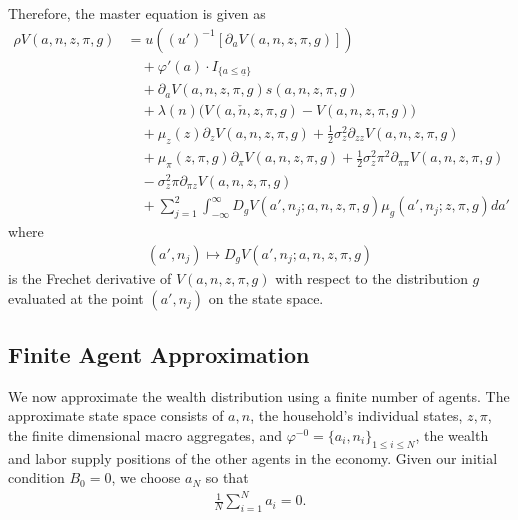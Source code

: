 \documentclass[notitlepage,a4paper,11pt]{report}
\numberwithin{section}{chapter}
\numberwithin{subsection}{section}
\begin{document}
Therefore, the master equation is given as 
\begin{align*}
\rho V(a,n,z,\pi,g) & = u \left(  (u')^{-1} \left[ \partial_a V(a,n,z, \pi,g) \right]  \right) \tag{Flow Utility + FOC} \\[10pt]
& \quad + \varphi'(a) \cdot I_{\{ a \leq \underline{a} \} } \tag{Borrowing Penalty}\\[10pt]
& \quad + \partial_a V(a,n,z,\pi,g) s(a,n,z,\pi,g)  \tag{Individual Wealth} \\[10pt]
& \quad + \lambda(n) \Big( V(a,\check{n},z,\pi,g)- V(a,n,z,\pi,g) \Big)\tag{Individual Labor Supply} \\[10pt]
& \quad + \mu_z(z) \partial_z V(a,n,z,\pi,g) + \frac{1}{2} \sigma_z^2 \partial_{zz} V(a,n,z,\pi,g) \tag{TFP} \\[10pt]
& \quad + \mu_{\pi}(z,\pi,g) \partial_{\pi} V(a,n,z,\pi,g)+ \frac{1}{2} \sigma_z^2 \pi^2 \partial_{\pi \pi} V(a,n,z,\pi,g) \tag{Inflation} \\[10pt]
& \quad - \sigma_z^2 \pi \partial_{\pi z} V(a,n,z,\pi,g) \tag{Cross Variation Term} \\[10pt]
& \quad + \sum_{j=1}^2 \int_{-\infty}^{\infty} D_g V(a',n_j ; a,n,z,\pi,g) \mu_g( a', n_j ; z,\pi, g) da'  \tag{Wealth Distribution} 
\end{align*}
where 
\begin{align*}
(a',n_j) \mapsto D_g V(a',n_j ; a,n,z,\pi,g)    
\end{align*}
is the Frechet derivative of $V(a,n, z,\pi, g)$ with respect to the distribution $g$ evaluated at the point $(a',n_j)$ on the state space. 






\pagebreak







\subsection{Finite Agent Approximation}

We now approximate the wealth distribution using a finite number of agents. The approximate state space consists of $a,n$, the household's individual states, $z,\pi$, the finite dimensional macro aggregates, and $\varphi^{-0} = \{ a_i, n_i\}_{1 \leq i \leq N}$, the wealth and labor supply positions of the other agents in the economy. Given our initial condition $B_0 = 0$, we choose $a_N$ so that 
\begin{align*}
    \frac{1}{N} \sum_{i=1}^N a_i = 0. 
\end{align*}
\end{document}
